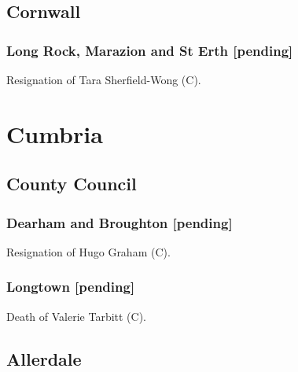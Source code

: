 \documentclass[a4paper,openany]{book}
\begin{document}
\begin{resultsiii}
\subsection*{Cornwall}

\subsubsection*{Long Rock, Marazion and St Erth \hspace*{\fill}\nolinebreak[1]%
	\enspace\hspace*{\fill}
	[pending]}


Resignation of Tara Sherfield-Wong (C).

\section{Cumbria}

\subsection*{County Council}

\subsubsection*{Dearham and Broughton \hspace*{\fill}\nolinebreak[1]%
	\enspace\hspace*{\fill}
	[pending]}


Resignation of Hugo Graham (C).

\subsubsection*{Longtown \hspace*{\fill}\nolinebreak[1]%
	\enspace\hspace*{\fill}
	[pending]}


Death of Valerie Tarbitt (C).

\subsection*{Allerdale}


\end{resultsiii}
\end{document}
